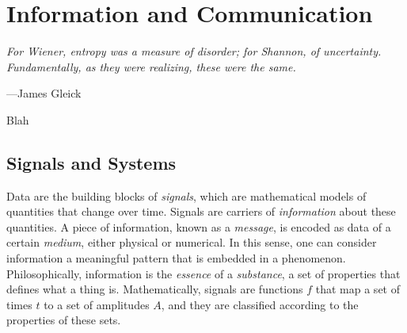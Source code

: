 

\toclineskip
\section{Information and Communication}

\vspace{4mm}
\begin{displayquote}
	\textit{For Wiener, entropy was a measure of disorder; for Shannon, of uncertainty. Fundamentally, as they were realizing, these were the same.}
	\vspace{2mm}
	\begin{flushright}
		---James Gleick
	\end{flushright}
\end{displayquote}
\vspace{4mm}


Blah


\subsection{Signals and Systems}

Data are the building blocks of \textit{signals}, which are mathematical models of quantities that change over time. Signals are carriers of \textit{information} about these quantities. A piece of information, known as a \textit{message}, is encoded as data of a certain \textit{medium}, either physical or numerical. In this sense, one can consider information a meaningful pattern that is embedded in a phenomenon. Philosophically, information is the \textit{essence} of a \textit{substance}, a set of properties that defines what a thing is. Mathematically, signals are functions $f$ that map a set of times $t$ to a set of amplitudes $A$, and they are classified according to the properties of these sets. \\

